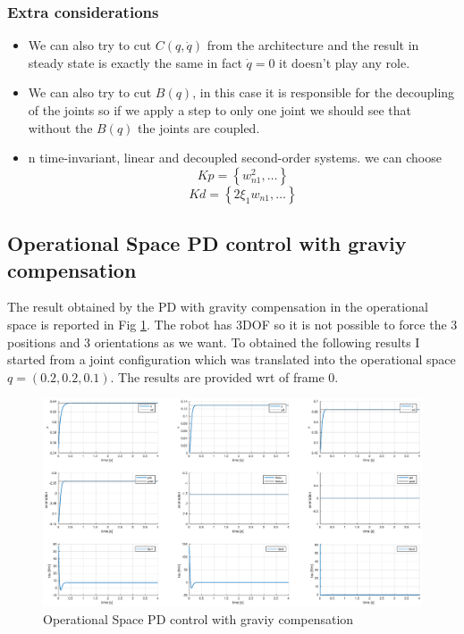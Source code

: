 \documentclass[a4paper,12pt]{article}
\begin{document}
\subsubsection{Extra considerations}

\begin{itemize}
\item We can also try to cut $C(q,\dot{q})$ from the architecture and the result in steady state is exactly the same in fact $\dot{q} = 0 $ it doesn't play any role. 

\item We can also try to cut $B(q)$, in this case it is responsible for the decoupling of the joints so if we apply a step to only one joint we should see that without the $B(q)$ the joints are coupled.

\item n time-invariant, linear and decoupled second-order systems. we can choose \[ Kp =  \left \{ w_{n1}^2 , \dots \right \} \] \[ Kd = \left \{2\xi_1 w_{n1}, \dots \right \} \]
\end{itemize}

\newpage
\subsection{Operational Space PD control with graviy compensation}

The result obtained by the PD with gravity compensation in the operational space is reported in Fig \ref{fig:gravity_op}. The robot has 3DOF so it is not possible to force the 3 positions and 3 orientations as we want. To obtained the following results I started from a joint configuration which was translated into the operational space $q = (0.2, 0.2, 0.1)$. The results are provided wrt of frame 0.
\begin{figure}[H]
    \begin{center}
        \hspace*{-4.5cm}
        \includegraphics[scale=0.5]{images/op_gravity.eps}
    \end{center}
    \caption{Operational Space PD control with graviy compensation}
    \label{fig:gravity_op}
\end{figure}
\end{document}
